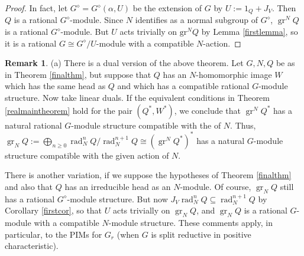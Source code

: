 \documentclass[11pt,leqno,amscd,amssymb,verbatim, url]{amsart}
\theoremstyle{definition}
\newtheorem{rem}[thm]{Remark}
\numberwithin{equation}{thm}
\newcommand{\gr}{\operatorname{ {gr}}}
\newcommand{\rad}{\operatorname{rad}}
\begin{document}
\begin{proof} In fact, let $G^\diamond=G^\diamond(\alpha,U)$ be the extension of $G$ by $U:=1_Q+J_{V}$. Then $Q$ is a rational $G^\diamond$-module. Since
$N$ identifies as a normal subgroup of $G^\diamond$, $\gr^NQ$ is a rational $G^\diamond$-module. But $U$ acts trivially
 on $\text{gr}^NQ$ by Lemma \ref{firstlemma}, so it is a rational $G\cong G^\diamond/U$-module with a compatible $N$-action.
\end{proof}

\begin{rem}\label{finalthmremark}(a) There is a dual version of the above theorem. Let $G,N,Q$ be as in Theorem \ref{finalthm}, but suppose that $Q$ has an $N$-homomorphic
image $W$ which has the same head as $Q$ and which has a compatible rational $G$-module structure. Now take linear duals. If the
equivalent conditions in Theorem \ref{realmaintheorem} hold for the pair $(Q^*,W^*)$, we conclude that
$\gr^NQ^*$ has a natural rational $G$-module structure compatible with the of $N$. Thus, $\gr_NQ:=\bigoplus_{n\geq 0}\rad^n_NQ/\rad^{n+1}_NQ\cong(\gr^NQ^*)^*$ has a natural $G$-module structure compatible with the given action of $N$.

There is another variation, if we  suppose the hypotheses of Theorem \ref{finalthm} and also that $Q$ has an irreducible
head as an $N$-module. Of course, $\gr_NQ$ still has a rational $G^\diamond$-module structure. But now $J_V\rad^n_NQ\subseteq \rad^{n+1}_NQ$ by Corollary \ref{firstcor}, so that $U$ acts trivially on $\gr_NQ$, and $\gr_NQ$ is a rational $G$-module with a compatible $N$-module structure.
These comments apply, in particular, to the PIMs for $G_r$ (when $G$ is split reductive in positive characteristic).


\end{rem}
\end{document}
